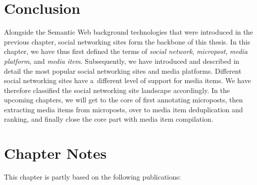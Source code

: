 \section{Conclusion}
Alongside the Semantic Web background technologies
that were introduced in the previous chapter,
social networking sites form the backbone of this thesis.
In this chapter, we have thus first defined the terms of \emph{social network},
\emph{micropost}, \emph{media platform}, and \emph{media item}.
Subsequently, we have introduced and described in detail
the most popular social networking sites and media platforms.
Different social networking sites have a~different level of support for media items.
We have therefore classified the social networking site landscape accordingly.
In the upcoming chapters, we will get to the core of
first annotating microposts,
then extracting media items from microposts,
over to media item deduplication and ranking,
and finally close the core part with media item compilation.

\section*{Chapter Notes}
This chapter is partly based on the following publications:
